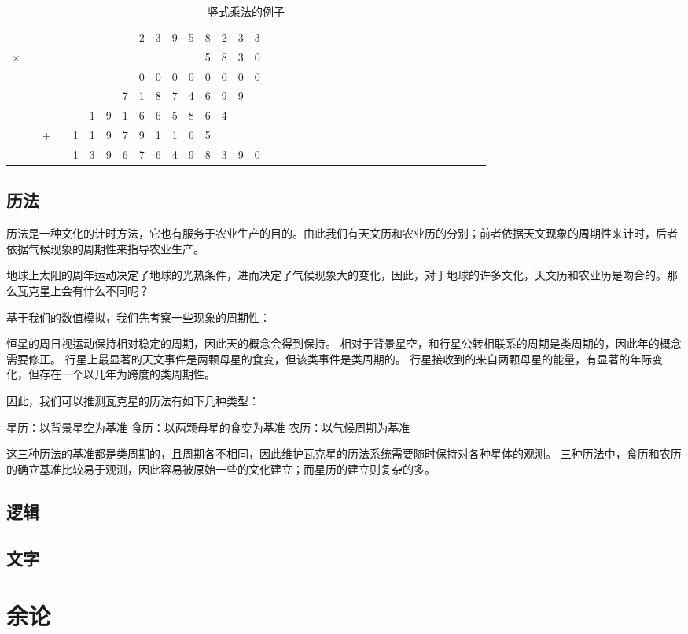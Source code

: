 \documentclass[a4paper,10.5pt]{article}
\begin{document}
\begin{table}[tbhp]
\centering
\begin{tabular}{cccccccccccccccccccccccccccccccccccc}
  &   &   &   &   &   &   &   & 2 & 3 & 9 & 5 & 8 & 2 & 3 & 3\\
× &   &   &   &   &   &   &   &   &   &   &   & 5 & 8 & 3 & 0\\
\hline
  &   &   &   &   &   &   &   & 0 & 0 & 0 & 0 & 0 & 0 & 0 & 0\\
  &   &   &   &   &   &   & 7 & 1 & 8 & 7 & 4 & 6 & 9 & 9 &  \\
  &   &   &   &   & 1 & 9 & 1 & 6 & 6 & 5 & 8 & 6 & 4 &   &  \\
  &   & + &   & 1 & 1 & 9 & 7 & 9 & 1 & 1 & 6 & 5 &   &   &  \\
\hline
  &   &   &   & 1 & 3 & 9 & 6 & 7 & 6 & 4 & 9 & 8 & 3 & 9 & 0\\
\end{tabular}
\caption{竖式乘法的例子}
\end{table}

\subsection{历法}

历法是一种文化的计时方法，它也有服务于农业生产的目的。由此我们有天文历和农业历的分别；前者依据天文现象的周期性来计时，后者依据气候现象的周期性来指导农业生产。

地球上太阳的周年运动决定了地球的光热条件，进而决定了气候现象大的变化，因此，对于地球的许多文化，天文历和农业历是吻合的。那么瓦克星上会有什么不同呢？

基于我们的数值模拟，我们先考察一些现象的周期性：

恒星的周日视运动保持相对稳定的周期，因此天的概念会得到保持。
相对于背景星空，和行星公转相联系的周期是类周期的，因此年的概念需要修正。
行星上最显著的天文事件是两颗母星的食变，但该类事件是类周期的。
行星接收到的来自两颗母星的能量，有显著的年际变化，但存在一个以几年为跨度的类周期性。

因此，我们可以推测瓦克星的历法有如下几种类型：

星历：以背景星空为基准
食历：以两颗母星的食变为基准
农历：以气候周期为基准

这三种历法的基准都是类周期的，且周期各不相同，因此维护瓦克星的历法系统需要随时保持对各种星体的观测。
三种历法中，食历和农历的确立基准比较易于观测，因此容易被原始一些的文化建立；而星历的建立则复杂的多。

\subsection{逻辑}

\subsection{文字}

\section{余论}
\end{document}
